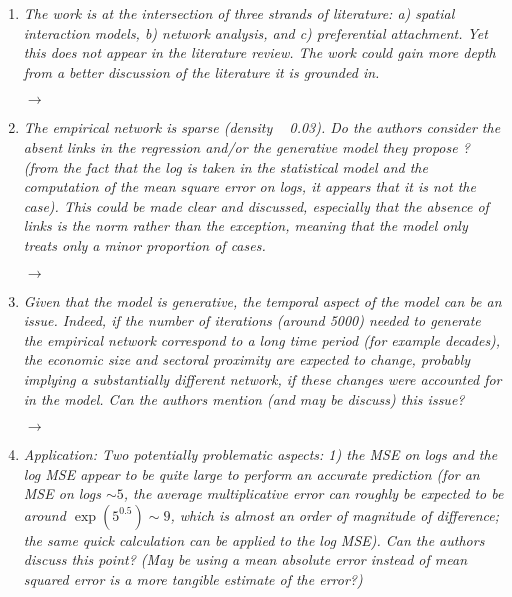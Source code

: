 \documentclass[10pt,a4paper,sans]{moderncv}        %
\begin{document}
\begin{enumerate}

	\item \textit{The work is at the intersection of three strands of literature: a) spatial interaction models, b) network analysis, and c) preferential attachment. Yet this does not appear in the literature review. The work could gain more depth from a better discussion of the literature it is grounded in.}
	
	$\rightarrow$ 
	
	\medskip


	\item \textit{The empirical network is sparse (density ~ 0.03). Do the authors consider the absent links in the regression and/or the generative model they propose ? (from the fact that the log is taken in the statistical model and the computation of the mean square error on logs, it appears that it is not the case). This could be made clear and discussed, especially that the absence of links is the norm rather than the exception, meaning that the model only treats only a minor proportion of cases.}
	
	$\rightarrow$ 
	
	\medskip


	\item \textit{Given that the model is generative, the temporal aspect of the model can be an issue. Indeed, if the number of iterations (around 5000) needed to generate the empirical network correspond to a long time period (for example decades), the economic size and sectoral proximity are expected to change, probably implying a substantially different network, if these changes were accounted for in the model. Can the authors mention (and may be discuss) this issue?}
	
	$\rightarrow$ 

	\medskip


	\item \textit{Application: Two potentially problematic aspects: 1) the MSE on logs and the log MSE appear to be quite large to perform an accurate prediction (for an MSE on logs $\sim 5$, the average multiplicative error can roughly be expected to be around $\exp(5^0.5) \sim 9$, which is almost an order of magnitude of difference; the same quick calculation can be applied to the log MSE). Can the authors discuss this point? (May be using a mean absolute error instead of mean squared error is a more tangible estimate of the error?)}
	

\end{enumerate}
\end{document}
